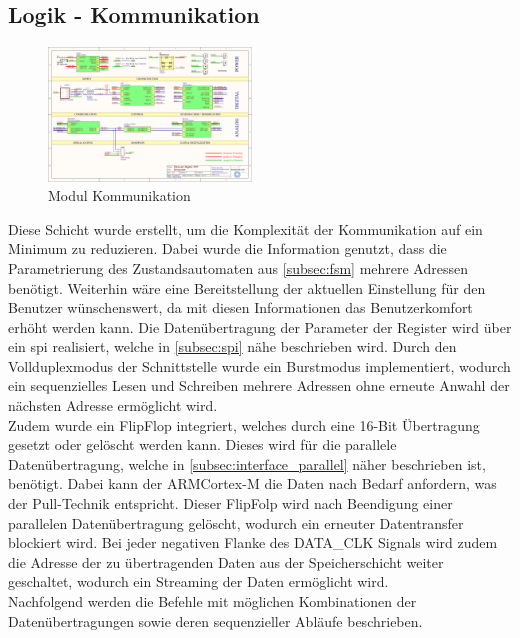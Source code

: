 \subsection{Logik - Kommunikation}
\begin{figure}[h!]
	\centering
	\includegraphics[page=11,width=0.48\textwidth, trim=58mm 99mm 185mm 53mm, clip=true]{images/pcb/new.PDF}%
	\caption{Modul Kommunikation}
	\label{fig:layer_com}
\end{figure}
Diese Schicht wurde erstellt, um die Komplexität der Kommunikation auf ein Minimum zu reduzieren. Dabei wurde die Information genutzt, dass die Parametrierung des Zustandsautomaten aus \autoref{subsec:fsm} mehrere Adressen benötigt. Weiterhin wäre eine Bereitstellung der aktuellen Einstellung für den Benutzer wünschenswert, da mit diesen Informationen das Benutzerkomfort erhöht werden kann. Die Datenübertragung der Parameter der Register wird über ein \ac{spi} realisiert, welche in \autoref{subsec:spi} nähe beschrieben wird. Durch den Vollduplexmodus der Schnittstelle wurde ein Burstmodus implementiert, wodurch ein sequenzielles Lesen und Schreiben mehrere Adressen ohne erneute Anwahl der nächsten Adresse ermöglicht wird.\\
Zudem wurde ein FlipFlop integriert, welches durch eine 16-Bit Übertragung gesetzt oder gelöscht werden kann. Dieses wird für die parallele Datenübertragung, welche in \autoref{subsec:interface_parallel} näher beschrieben ist, benötigt. Dabei kann der ARM\SymbReg Cortex\SymbReg-M die Daten nach Bedarf anfordern, was der Pull-Technik entspricht. Dieser FlipFolp wird nach Beendigung einer parallelen Datenübertragung gelöscht, wodurch ein erneuter Datentransfer blockiert wird. 
Bei jeder negativen Flanke des DATA\_CLK Signals wird zudem die Adresse der zu übertragenden Daten aus der Speicherschicht weiter geschaltet, wodurch ein Streaming der Daten ermöglicht wird.\\
Nachfolgend werden die Befehle mit möglichen Kombinationen der Datenübertragungen sowie deren sequenzieller Abläufe beschrieben.
